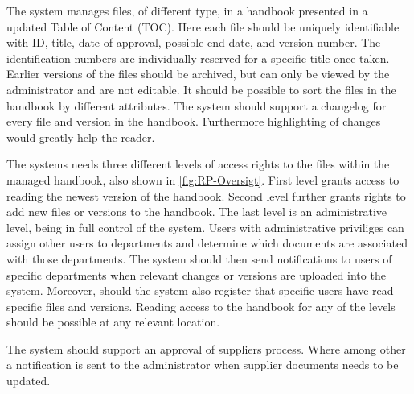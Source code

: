 The system manages files, of different type, in a handbook presented in a updated Table of Content (TOC).
Here each file should be uniquely identifiable with ID, title, date of approval, possible end date, and version number. 
The identification numbers are individually reserved for a specific title once taken.
Earlier versions of the files should be archived, but can only be viewed by the administrator and are not editable.
It should be possible to sort the files in the handbook by different attributes.
The system should support a changelog for every file and version in the handbook. 
Furthermore highlighting of changes would greatly help the reader.

The systems needs three different levels of access rights to the files within the managed handbook, also shown in \cref{fig:RP-Oversigt}.
First level grants access to reading the newest version of the handbook. 
Second level further grants rights to add new files or versions to the handbook. 
The last level is an administrative level, being in full control of the system.
Users with administrative priviliges can assign other users to departments and determine which documents are associated with those departments.
The system should then send notifications to users of specific departments when relevant changes or versions are uploaded into the system.
Moreover, should the system also register that specific users have read specific files and versions.
Reading access to the handbook for any of the levels should be possible at any relevant location.

The system should support an approval of suppliers process.
Where among other a notification is sent to the administrator when supplier documents needs to be updated. 

